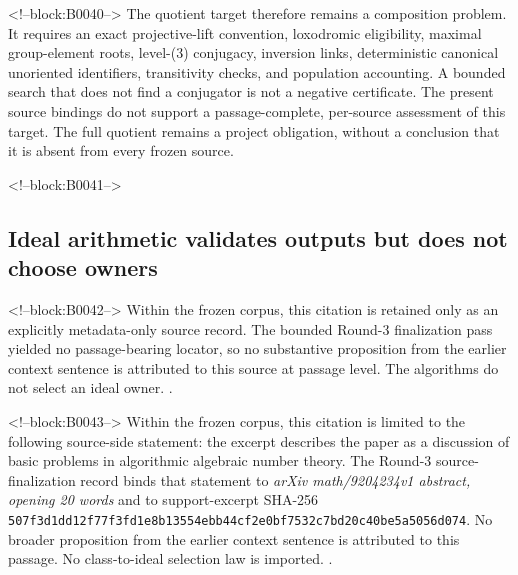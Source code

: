 \documentclass[11pt,a4paper]{article}
\begin{document}
<!--block:B0040-->
The quotient target therefore remains a composition problem. It requires an exact projective-lift convention, loxodromic eligibility, maximal group-element roots, level-(3) conjugacy, inversion links, deterministic canonical unoriented identifiers, transitivity checks, and population accounting. A bounded search that does not find a conjugator is not a negative certificate. The present source bindings do not support a passage-complete, per-source assessment of this target. The full quotient remains a project obligation, without a conclusion that it is absent from every frozen source.

<!--block:B0041-->
\subsection{Ideal arithmetic validates outputs but does not choose owners}

<!--block:B0042-->
Within the frozen corpus, this citation is retained only as an explicitly metadata-only source record. The bounded Round-3 finalization pass yielded no passage-bearing locator, so no substantive proposition from the earlier context sentence is attributed to this source at passage level. The algorithms do not select an ideal owner.
\citep{P29-S19}.

<!--block:B0043-->
Within the frozen corpus, this citation is limited to the following source-side statement: the excerpt describes the paper as a discussion of basic problems in algorithmic algebraic number theory. The Round-3 source-finalization record binds that statement to \emph{arXiv math/9204234v1 abstract, opening 20 words} and to support-excerpt SHA-256 \texttt{507f3d1d\allowbreak{}d12f77f3\allowbreak{}fd1e8b13\allowbreak{}554ebb44\allowbreak{}cf2e0bf7\allowbreak{}532c7bd2\allowbreak{}0c40be5a\allowbreak{}5056d074}. No broader proposition from the earlier context sentence is attributed to this passage. No class-to-ideal selection law is imported.
\citep{P29-S20}.
\end{document}
